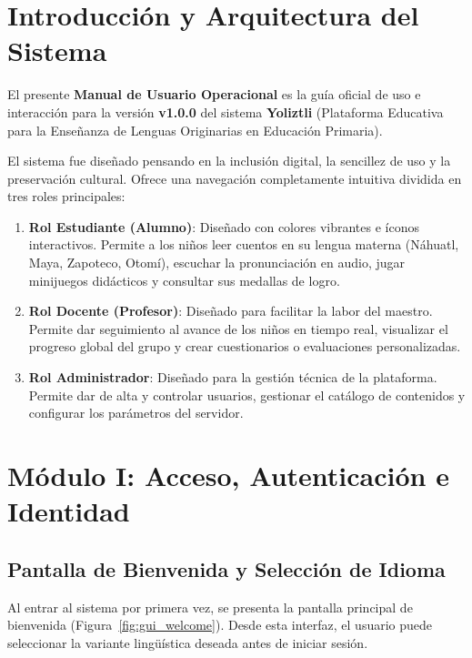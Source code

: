\documentclass[12pt]{article}
\begin{document}


\newpage
{
\hypersetup{linkcolor=black}
\tableofcontents
}
\newpage

\section{Introducción y Arquitectura del Sistema}

El presente \textbf{Manual de Usuario Operacional} es la guía oficial de uso e interacción para la versión \textbf{v1.0.0} del sistema \textbf{Yoliztli} (Plataforma Educativa para la Enseñanza de Lenguas Originarias en Educación Primaria).

El sistema fue diseñado pensando en la inclusión digital, la sencillez de uso y la preservación cultural. Ofrece una navegación completamente intuitiva dividida en tres roles principales:
\begin{enumerate}
    \item \textbf{Rol Estudiante (Alumno)}: Diseñado con colores vibrantes e íconos interactivos. Permite a los niños leer cuentos en su lengua materna (Náhuatl, Maya, Zapoteco, Otomí), escuchar la pronunciación en audio, jugar minijuegos didácticos y consultar sus medallas de logro.
    \item \textbf{Rol Docente (Profesor)}: Diseñado para facilitar la labor del maestro. Permite dar seguimiento al avance de los niños en tiempo real, visualizar el progreso global del grupo y crear cuestionarios o evaluaciones personalizadas.
    \item \textbf{Rol Administrador}: Diseñado para la gestión técnica de la plataforma. Permite dar de alta y controlar usuarios, gestionar el catálogo de contenidos y configurar los parámetros del servidor.
\end{enumerate}

\newpage
\section{Módulo I: Acceso, Autenticación e Identidad}

\subsection{Pantalla de Bienvenida y Selección de Idioma}
Al entrar al sistema por primera vez, se presenta la pantalla principal de bienvenida (Figura~\ref{fig:gui_welcome}). Desde esta interfaz, el usuario puede seleccionar la variante lingüística deseada antes de iniciar sesión.
\end{document}
